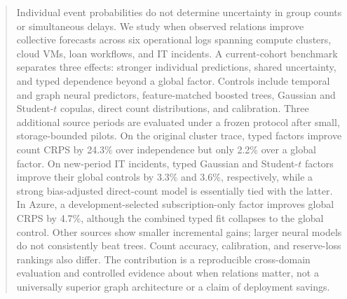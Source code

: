 \begin{abstract}
Individual event probabilities do not determine uncertainty in group counts
or simultaneous delays. We study when observed relations improve collective
forecasts across six operational logs spanning compute clusters, cloud VMs,
loan workflows, and IT incidents. A current-cohort benchmark separates three
effects: stronger individual predictions, shared uncertainty, and typed
dependence beyond a global factor. Controls include temporal and graph neural
predictors, feature-matched boosted trees, Gaussian and Student-$t$ copulas,
direct count distributions, and calibration. Three additional source periods
are evaluated under a frozen protocol after small, storage-bounded pilots.
On the original cluster trace, typed factors improve count CRPS by 24.3\%
over independence but only 2.2\% over a global factor. On new-period IT
incidents, typed Gaussian and Student-$t$ factors improve their global
controls by 3.3\% and 3.6\%, respectively, while a strong bias-adjusted
direct-count model is essentially tied with the latter. In Azure, a
development-selected subscription-only factor improves global CRPS by 4.7\%,
although the combined typed fit collapses to the global control. Other sources
show smaller incremental gains; larger neural models do not
consistently beat trees. Count accuracy, calibration, and reserve-loss rankings
also differ. The contribution is a reproducible cross-domain evaluation and
controlled evidence about when relations matter, not a universally superior
graph architecture or a claim of deployment savings.
\end{abstract}
